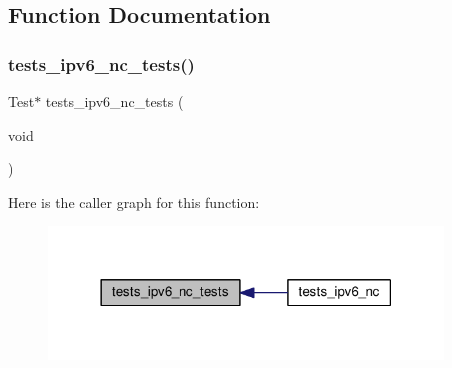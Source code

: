 \subsection{Function Documentation}
\mbox{\label{tests-ipv6__nc_8c_afec00e43d22f7bde6c086d7cb05e1653}} 
\subsubsection{\texorpdfstring{tests\+\_\+ipv6\+\_\+nc\+\_\+tests()}{tests\_ipv6\_nc\_tests()}}
{\footnotesize\ttfamily Test$\ast$ tests\+\_\+ipv6\+\_\+nc\+\_\+tests (\begin{DoxyParamCaption}\item[{void}]{ }\end{DoxyParamCaption})}

Here is the caller graph for this function\+:
\nopagebreak
\begin{figure}[H]
\begin{center}
\leavevmode
\includegraphics[width=297pt]{tests-ipv6__nc_8c_afec00e43d22f7bde6c086d7cb05e1653_icgraph}
\end{center}
\end{figure}
